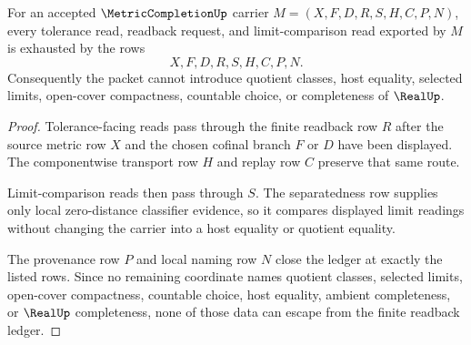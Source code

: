 \begin{theorem}
\label{thm:metric-completion-finite-readback-ledger-nonescape}
For an accepted $\MetricCompletionUp$ carrier $M=(X,F,D,R,S,H,C,P,N)$, every tolerance read, readback request, and limit-comparison read exported by $M$ is exhausted by the rows
$$
X,F,D,R,S,H,C,P,N .
$$
Consequently the packet cannot introduce quotient classes, host equality, selected limits, open-cover compactness, countable choice, or completeness of $\RealUp$.
\end{theorem}
\begin{proof}
Tolerance-facing reads pass through the finite readback row $R$ after the source metric row $X$ and the chosen cofinal branch $F$ or $D$ have been displayed. The componentwise transport row $H$ and replay row $C$ preserve that same route.

Limit-comparison reads then pass through $S$. The separatedness row supplies only local zero-distance classifier evidence, so it compares displayed limit readings without changing the carrier into a host equality or quotient equality.

The provenance row $P$ and local naming row $N$ close the ledger at exactly the listed rows. Since no remaining coordinate names quotient classes, selected limits, open-cover compactness, countable choice, host equality, ambient completeness, or $\RealUp$ completeness, none of those data can escape from the finite readback ledger.
\end{proof}

